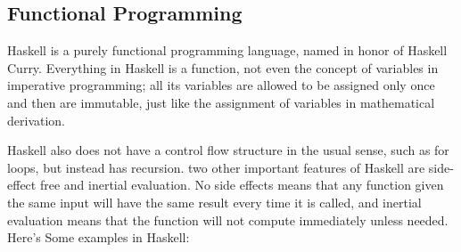 \documentclass[a4paper]{exam}
\begin{document}
\subsection{Functional Programming}

Haskell is a purely functional programming language, named in honor of Haskell Curry. Everything in Haskell is a function, not even the concept of variables in imperative programming; all its variables are allowed to be assigned only once and then are immutable, just like the assignment of variables in mathematical derivation.

Haskell also does not have a control flow structure in the usual sense, such as for loops, but instead has recursion. two other important features of Haskell are side-effect free and inertial evaluation. No side effects means that any function given the same input will have the same result every time it is called, and inertial evaluation means that the function will not compute immediately unless needed. Here's Some examples in Haskell:
\end{document}
